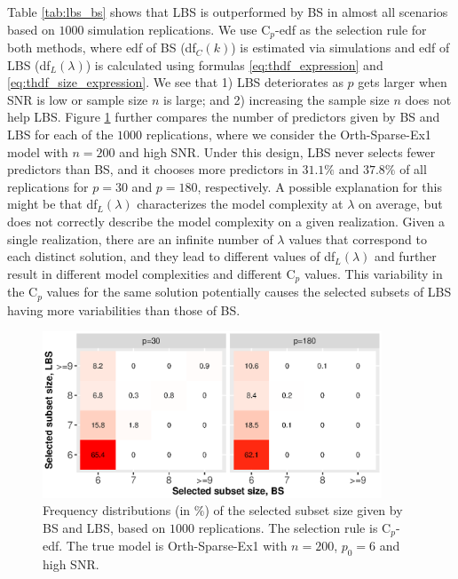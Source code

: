 Table \ref{tab:lbs_bs} shows that LBS is outperformed by BS in almost all scenarios based on $1000$ simulation replications. We use C$_p$-edf as the selection rule for both methods, where edf of BS (df$_C(k)$) is estimated via simulations and edf of LBS (df$_L(\lambda)$) is calculated using formulas \eqref{eq:thdf_expression} and \eqref{eq:thdf_size_expression}. We see that 1) LBS deteriorates as $p$ gets larger when SNR is low or sample size $n$ is large; and 2) increasing the sample size $n$ does not help LBS. Figure \ref{fig:numvar_bs_lbs} further compares the number of predictors given by BS and LBS for each of the $1000$ replications, where we consider the Orth-Sparse-Ex1 model with $n=200$ and high SNR. Under this design, LBS never selects fewer predictors than BS, and it chooses more predictors in $31.1\%$ and $37.8\%$ of all replications for $p=30$ and $p=180$, respectively. A possible explanation for this might be that df$_L(\lambda)$ characterizes the model complexity at $\lambda$ on average, but does not correctly describe the model complexity on a given realization. Given a single realization, there are an infinite number of $\lambda$ values that correspond to each distinct solution, and they lead to different values of df$_L(\lambda)$ and further result in different model complexities and different C$_p$ values. This variability in the C$_p$ values for the same solution potentially causes the selected subsets of LBS having more variabilities than those of BS. 





\clearpage
\begin{figure}[!ht]
	\centering
	\includegraphics[width=0.9\textwidth]{figures/numvar_bs_lbs.eps}
	\caption{Frequency distributions (in $\%$) of the selected subset size  given by BS and LBS, based on $1000$ replications. The selection rule is C$_p$-edf. The true model is Orth-Sparse-Ex1 with $n=200$, $p_0=6$ and high SNR.}
	\label{fig:numvar_bs_lbs} 
\end{figure}

